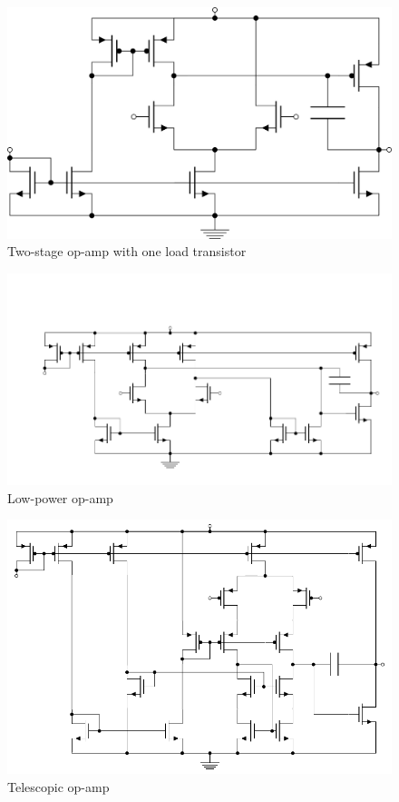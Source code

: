 \begin{figure}[H]
	\centering
	\includegraphics[width=0.6\linewidth]{Fig/TwoStageNMOSOpAmpWithOneLoadTransistor.PNG}
	\caption{Two-stage op-amp with one load transistor \cite{Allen}} \label{fig:TwoStageNMOSOpAmpWithOneLoadTransistor}
\end{figure}

\begin{figure}[H]
	\centering
	\includegraphics[width=0.9\linewidth]{Fig/LowPowerOpAmpWithTwoLoads.PNG}
	\caption{Low-power op-amp \cite{Allen}} \label{fig:lowPowerOpAmp}
\end{figure}

\begin{figure}[H]
	\centering
	\includegraphics[width=0.9\linewidth]{Fig/OpAmpWithCascodeFirstStage.PNG}
	\caption{Telescopic op-amp} \label{fig:telescopicOpAmp1}
\end{figure}

